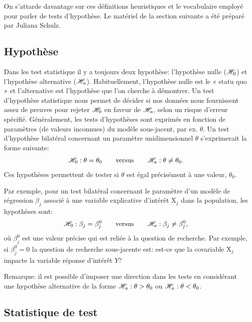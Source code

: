 \documentclass[
  11pt,
  letterpaper,
]{book}
\begin{document}
On s'attarde davantage sur ces définitions heuristiques et le vocabulaire employé pour parler de tests d'hypothèse. Le matériel de la section suivante a été préparé par Juliana Schulz.

\hypertarget{hypothuxe8se}{%
\subsection{Hypothèse}\label{hypothuxe8se}}

Dans les test statistique il y a toujours deux hypothèse: l'hypothèse nulle (\(\mathscr{H}_0\)) et l'hypothèse alternative (\(\mathscr{H}_a\)). Habituellement, l'hypothèse nulle est le « statu quo » et l'alternative est l'hypothèse que l'on cherche à démontrer. Un test d'hypothèse statistique nous permet de décider si nos données nous fournissent assez de preuves pour rejeter \(\mathscr{H}_0\) en faveur de \(\mathscr{H}_a\), selon un risque d'erreur spécifié. Généralement, les tests d'hypothèses sont exprimés en fonction de paramètres (de valeurs inconnues) du modèle sous-jacent, par ex. \(\theta\). Un test d'hypothèse bilatéral concernant un paramètre unidimensionnel \(\theta\) s'exprimerait la forme suivante:
\begin{align*}
\mathscr{H}_0: \theta=\theta_0 \qquad \text{versus} \qquad \mathscr{H}_a:\theta \neq \theta_0.
\end{align*}
Ces hypothèses permettent de tester si \(\theta\) est égal précisément à une valeur, \(\theta_0\).

Par exemple, pour un test bilatéral concernant le paramètre d'un modèle de régression \(\beta_j\) associé à une variable explicative d'intérêt \(\mathrm{X}_j\) dans la population, les hypothèses sont:
\begin{align*}
\mathscr{H}_0: \beta_j=\beta_j^0 \qquad \text{versus} \qquad \mathscr{H}_a:\beta_j \neq \beta_j^0, 
\end{align*}
où \(\beta_j^0\) est une valeur précise qui est reliée à la question de recherche. Par exemple, si \(\beta_j^0=0\) la question de recherche sous-jacente est: est-ce que la covariable \(\mathrm{X}_j\) impacte la variable réponse d'intérêt \(Y\)?

Remarque: il est possible d'imposer une direction dans les tests en considérant une hypothèse alternative de la forme \(\mathscr{H}_a: \theta > \theta_0\) ou \(\mathscr{H}_a: \theta < \theta_0\).

\hypertarget{statistique-de-test}{%
\subsection{Statistique de test}\label{statistique-de-test}}
\end{document}
